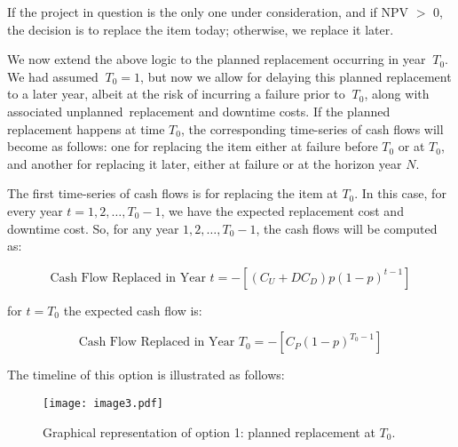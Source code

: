 If the project in question is the only one under consideration, and if  \( \text{NPV} \)  $>$ 0,
the decision is to replace the item today; otherwise, we replace it later.

We now extend the above logic to the planned replacement occurring in year \( ~T_{0} \).
We had assumed  \( ~T_{0}=1 \), but now we allow for
delaying this planned replacement to a later year, albeit at the risk of incurring
a failure prior to  \( ~T_{0} \), along with associated unplanned\ replacement
and downtime costs.  If the planned replacement happens at time  \( T_{0} \), the
corresponding time-series of cash flows will become as follows: one for replacing the item
either at failure before  \( T_{0} \)  or at  \( T_{0} \),
and another for replacing it later, either at failure or at the horizon year  \( N \).\par

The first time-series of cash flows is for replacing the item at  \( T_{0} \).
In this case, for every year  \( t=1, 2, \ldots, T_{0}-1 \), we have the expected
replacement cost and downtime cost. So, for any year  \( 1, 2,\ldots, T_{0}-1 \),
the cash flows will be computed as:\par

\begin{equation}\label{npv_8}
\mbox{Cash Flow Replaced in Year }t= - \left[  \left( C_{U}+DC_{D} \right)  p \left( 1-p \right) ^{t-1} \right]
\end{equation}

for  \( t=T_{0} \)  the expected cash flow is:\par

\begin{equation}\label{npv_9}
\text{Cash Flow Replaced in Year }T_{0}= - \left[ C_{P} \left( 1-p \right) ^{T_{0}-1} \right]
\end{equation}

The timeline of this option is illustrated as follows: \par



\begin{figure}
    \centering
    \centerline{\texttt{[image: image3.pdf]}}
    \caption{Graphical representation of option 1: planned replacement at $T_0$.}
    \label{fig:_Graphical_representation_of_option_1_planned_replacement_at_}
\end{figure}

